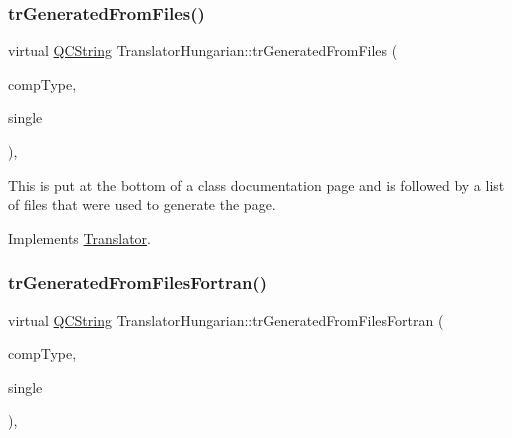 \mbox{\label{class_translator_hungarian_ae2b1bc81a9d5023411553025cbe94c7e}} 
\subsubsection{\texorpdfstring{trGeneratedFromFiles()}{trGeneratedFromFiles()}}
{\footnotesize\ttfamily virtual \mbox{\hyperlink{class_q_c_string}{Q\+C\+String}} Translator\+Hungarian\+::tr\+Generated\+From\+Files (\begin{DoxyParamCaption}\item[{\mbox{\hyperlink{class_class_def_ae70cf86d35fe954a94c566fbcfc87939}{Class\+Def\+::\+Compound\+Type}}}]{comp\+Type,  }\item[{bool}]{single }\end{DoxyParamCaption})\hspace{0.3cm}{\ttfamily [inline]}, {\ttfamily [virtual]}}

This is put at the bottom of a class documentation page and is followed by a list of files that were used to generate the page. 

Implements \mbox{\hyperlink{class_translator}{Translator}}.

\mbox{\label{class_translator_hungarian_a3becec21ed861903362bb7cce0c9b79f}} 
\subsubsection{\texorpdfstring{trGeneratedFromFilesFortran()}{trGeneratedFromFilesFortran()}}
{\footnotesize\ttfamily virtual \mbox{\hyperlink{class_q_c_string}{Q\+C\+String}} Translator\+Hungarian\+::tr\+Generated\+From\+Files\+Fortran (\begin{DoxyParamCaption}\item[{\mbox{\hyperlink{class_class_def_ae70cf86d35fe954a94c566fbcfc87939}{Class\+Def\+::\+Compound\+Type}}}]{comp\+Type,  }\item[{bool}]{single }\end{DoxyParamCaption})\hspace{0.3cm}{\ttfamily [inline]}, {\ttfamily [virtual]}}

